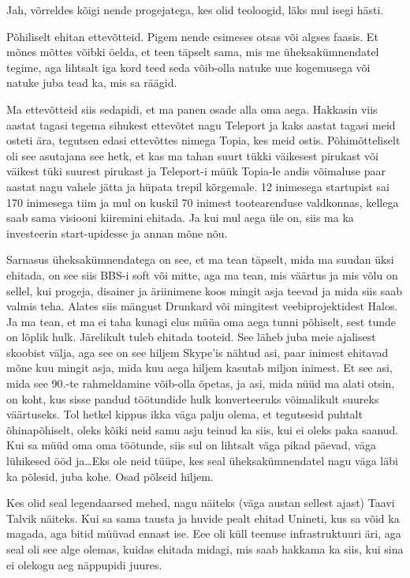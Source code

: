 
Jah, võrreldes kõigi nende progejatega, kes olid teoloogid, läks mul isegi hästi.


Põhiliselt ehitan ettevõtteid. Pigem nende esimeses otsas või algses faasis. Et mõnes mõttes võibki öelda, et teen täpselt sama, mis me üheksakümnendatel tegime, aga lihtsalt iga kord teed seda võib-olla natuke uue kogemusega või natuke juba tead ka, mis sa räägid. 

Ma ettevõtteid siis sedapidi, et ma panen osade alla oma aega. Hakkasin viis aastat tagasi tegema sihukest ettevõtet nagu Teleport ja kaks aastat tagasi meid osteti ära, tegutsen edasi ettevõttes nimega Topia, kes  meid ostis. Põhimõtteliselt oli see asutajana see hetk, et kas ma tahan suurt tükki väikesest pirukast või väikest tüki suurest pirukast ja Teleport-i müük Topia-le andis võimaluse paar aastat nagu vahele jätta ja hüpata trepil kõrgemale. 12 inimesega startupist sai 170 inimesega tiim ja mul on kuskil 70 inimest tootearenduse valdkonnas, kellega saab sama visiooni kiiremini ehitada. Ja kui mul aega üle on, siis ma ka investeerin start-upidesse ja annan mõne nõu. 

Sarnasus üheksakümnendatega on see, et ma tean täpselt, mida ma suudan üksi ehitada, on see siis BBS-i soft või mitte, aga ma tean, mis väärtus ja mis võlu on sellel, kui progeja, disainer ja äriinimene koos mingit asja teevad ja mida siis saab valmis teha. Alates siis mängust Drunkard või  mingitest veebiprojektidest Halos. Ja ma tean, et ma ei taha kunagi elus müüa oma aega tunni põhiselt, sest tunde on lõplik hulk. Järelikult tuleb ehitada tooteid. See läheb juba meie ajalisest skoobist välja, aga see on see hiljem Skype'is nähtud asi, paar inimest ehitavad mõne kuu mingit asja, mida kuu aega hiljem kasutab miljon inimest. Et see asi, mida  see 90.-te  rahmeldamine võib-olla õpetas, ja asi, mida nüüd ma alati otsin, on koht, kus sisse pandud töötundide hulk konverteeruks võimalikult suureks väärtuseks. Tol hetkel kippus ikka väga palju olema, et tegutsesid  puhtalt õhinapõhiselt, oleks kõiki neid samu asju teinud ka siis, kui ei oleks paka saanud. Kui sa müüd oma oma töötunde, siis sul on lihtsalt väga pikad päevad, väga lühikesed ööd ja\ldots Eks ole neid tüüpe, kes seal üheksakümnendatel nagu väga läbi ka põlesid, juba kohe. Osad põlseid hiljem. 

Kes olid seal legendaarsed mehed, nagu näiteks (väga austan sellest ajast)  Taavi Talvik näiteks. Kui sa  sama tausta ja huvide pealt ehitad Unineti, kus sa võid ka magada, aga bitid müüvad ennast ise. Eee oli küll  teenuse infrastruktuuri äri, aga seal oli see alge olemas, kuidas ehitada midagi, mis saab hakkama ka siis, kui sina ei olekogu aeg näppupidi juures.